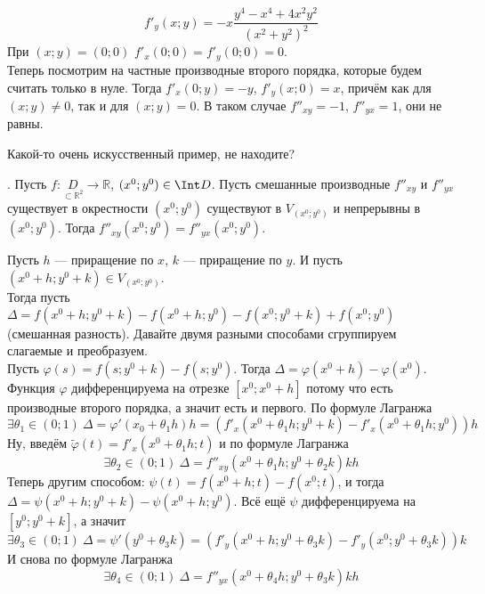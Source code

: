 \documentclass{article}
\begin{document}
\begin{itemize}
\begin{Example}
\[            \]
            \[
            f'_y(x;y)=-x\frac{y^4-x^4+4x^2y^2}{(x^2+y^2)^2}
            \]
            При $(x;y)=(0;0)$ $f'_x(0;0)=f'_y(0;0)=0$.\\
            Теперь посмотрим на частные производные второго порядка, которые будем считать только в нуле. Тогда $f'_x(0;y)=-y$, $f'_y(x;0)=x$, причём как для $(x;y)\neq0$, так и для $(x;y)=0$. В таком случае $f''_{xy}=-1$, $f''_{yx}=1$, они не равны.
        \end{Example}
        \begin{Comment}
            Какой-то очень искусственный пример, не находите?
        \end{Comment}
        \thm {}. Пусть $f\colon\underset{\subset\mathbb R^2}D\to\mathbb R$, $(x^0;y^0)\in\Int D$. Пусть смешанные производные $f''_{xy}$ и $f''_{yx}$ существует в окрестности $(x^0;y^0)$ существуют в $V_{(x^0;y^0)}$ и непрерывны в $(x^0;y^0)$. Тогда $f''_{xy}(x^0;y^0)=f''_{yx}(x^0;y^0)$.
        \begin{Proof}
            Пусть $h$ --- приращение по $x$, $k$ --- приращение по $y$. И пусть $(x^0+h;y^0+k)\in V_{(x^0;y^0)}$.\\
            Тогда пусть $\Delta=f(x^0+h;y^0+k)-f(x^0+h;y^0)-f(x^0;y^0+k)+f(x^0;y^0)$ (смешанная разность). Давайте двумя разными способами сгруппируем слагаемые и преобразуем.\\
            Пусть $\varphi(s)=f(s;y^0+k)-f(s;y^0)$. Тогда $\Delta=\varphi(x^0+h)-\varphi(x^0)$. Функция $\varphi$ дифференцируема на отрезке $[x^0;x^0+h]$ потому что есть производные второго порядка, а значит есть и первого. По формуле Лагранжа
            $$
            \exists\theta_1\in(0;1)~\Delta=\varphi'(x_0+\theta_1h)h=(f'_x(x^0+\theta_1h;y^0+k)-f'_x(x^0+\theta_1h;y^0))h
            $$
            Ну, введём $\tilde\varphi(t)=f'_x(x^0+\theta_1h;t)$ и по формуле Лагранжа
            $$
            \exists\theta_2\in(0;1)~\Delta=f''_{xy}(x^0+\theta_1h;y^0+\theta_2k)kh
            $$
            Теперь другим способом: $\psi(t)=f(x^0+h;t)-f(x^0;t)$, и тогда $\Delta=\psi(x^0+h;y^0+k)-\psi(x^0+h;y^0)$. Всё ещё $\psi$ дифференцируема на $[y^0;y^0+k]$, а значит
            $$
            \exists\theta_3\in(0;1)~\Delta=\psi'(y^0+\theta_3k)=(f'_y(x^0+h;y^0+\theta_3k)-f'_y(x^0;y^0+\theta_3k))k
            $$
            И снова по формуле Лагранжа
            $$
            \exists\theta_4\in(0;1)~\Delta=f''_{yx}(x^0+\theta_4h;y^0+\theta_3k)kh
            $$

\end{Proof}
\end{itemize}
\end{document}
